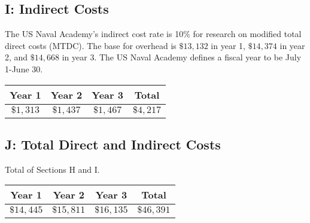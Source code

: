 \documentclass[11pt]{article}
\begin{document}
\subsection*{I: Indirect Costs}
The US Naval Academy's indirect cost rate is 10\% for research on
modified total direct costs (MTDC).  The base for overhead is
$\$13,132$ in year 1, $\$14,374$ in year 2, and $\$14,668$ in
year 3.  The US Naval Academy defines a fiscal year to be July 1-June
30.
\begin{center}
  \begin{tabular}{|c|c|c|c|}
    \hline
    Year 1 & Year 2 & Year 3 & Total \\
    \hline
    $\$1,313$ & $\$1,437$ & $\$1,467$ & $\$4,217$ \\
    \hline
  \end{tabular}
\end{center}


\subsection*{J: Total Direct and Indirect Costs}
Total of Sections H and I.
\begin{center}
  \begin{tabular}{|c|c|c|c|}
    \hline
    Year 1 & Year 2 & Year 3 & Total \\
    \hline
    $\$14,445$ & $\$15,811$ & $\$16,135$ & $\$46,391$ \\
    \hline
  \end{tabular}
\end{center}
\end{document}

